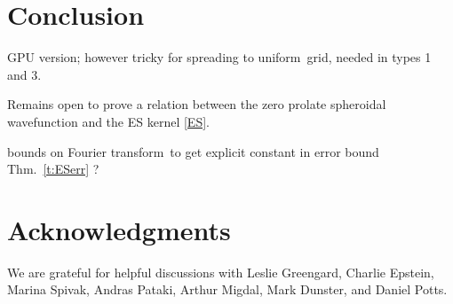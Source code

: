\documentclass[10pt]{article}
\newcommand{\U}{{uniform}}
\newcommand{\FT}{Fourier transform}
\begin{document}
\section{Conclusion}



GPU version; however tricky for spreading to \U\ grid, needed in types 1 and 3.


Remains open to prove a relation between the zero prolate spheroidal
wavefunction and the ES kernel \eqref{ES}.

bounds on \FT\ to get
explicit constant in error bound Thm.~\ref{t:ESerr} ?


\section*{Acknowledgments}

We are grateful for helpful discussions with Leslie Greengard,
Charlie Epstein, Marina Spivak, Andras Pataki, Arthur Migdal,
Mark Dunster,
and Daniel Potts.




\end{document}
